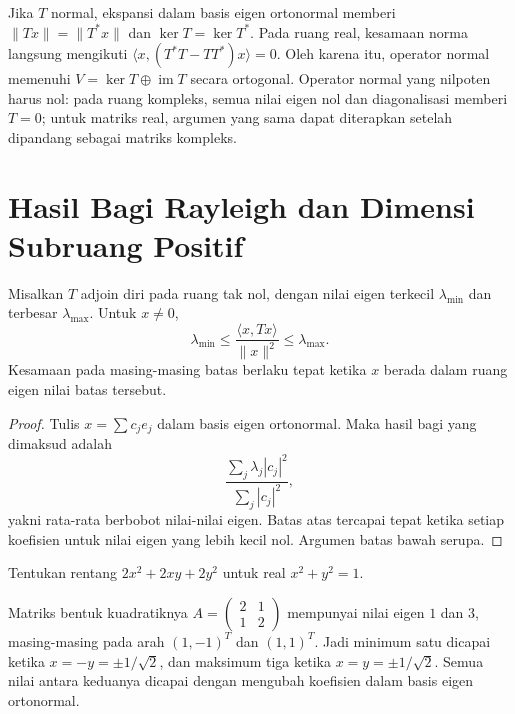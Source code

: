 Jika $T$ normal, ekspansi dalam basis eigen ortonormal memberi
$\|Tx\|=\|T^*x\|$ dan $\ker T=\ker T^*$.
Pada ruang real, kesamaan norma langsung mengikuti
$\langle x,(T^*T-TT^*)x\rangle=0$.
Oleh karena itu, operator normal memenuhi
$V=\ker T\oplus\operatorname{im}T$ secara ortogonal.
Operator normal yang nilpoten harus nol: pada ruang kompleks,
semua nilai eigen nol dan diagonalisasi memberi $T=0$;
untuk matriks real, argumen yang sama dapat diterapkan setelah
dipandang sebagai matriks kompleks.

\section{Hasil Bagi Rayleigh dan Dimensi Subruang Positif}

\begin{teorema}
    Misalkan $T$ adjoin diri pada ruang tak nol, dengan nilai
    eigen terkecil $\lambda_{\min}$ dan terbesar $\lambda_{\max}$.
    Untuk $x\ne0$,
    \[
        \lambda_{\min}\le
        \frac{\langle x,Tx\rangle}{\|x\|^2}
        \le\lambda_{\max}.
    \]
    Kesamaan pada masing-masing batas berlaku tepat ketika
    $x$ berada dalam ruang eigen nilai batas tersebut.
\end{teorema}
\begin{proof}
    Tulis $x=\sum c_je_j$ dalam basis eigen ortonormal.
    Maka hasil bagi yang dimaksud adalah
    \[
        \frac{\sum_j\lambda_j|c_j|^2}{\sum_j|c_j|^2},
    \]
    yakni rata-rata berbobot nilai-nilai eigen.
    Batas atas tercapai tepat ketika setiap koefisien untuk
    nilai eigen yang lebih kecil nol. Argumen batas bawah serupa.
\end{proof}

\begin{exam}
    Tentukan rentang $2x^2+2xy+2y^2$ untuk real $x^2+y^2=1$.
\end{exam}
\begin{solution}
    Matriks bentuk kuadratiknya $A=\begin{pmatrix}2&1\\1&2\end{pmatrix}$
    mempunyai nilai eigen $1$ dan $3$, masing-masing pada arah
    $(1,-1)^T$ dan $(1,1)^T$.
    Jadi minimum satu dicapai ketika $x=-y=\pm1/\sqrt2$,
    dan maksimum tiga ketika $x=y=\pm1/\sqrt2$.
    Semua nilai antara keduanya dicapai dengan mengubah
    koefisien dalam basis eigen ortonormal.
\end{solution}

